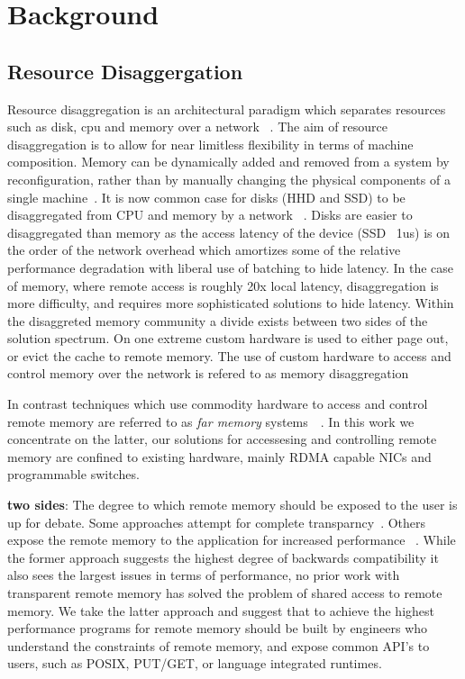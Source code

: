 \section{Background}


\subsection{Resource Disaggergation}

Resource disaggregation is an architectural paradigm which separates resources
such as disk, cpu and memory over a network ~\cite{requirements,legoos}. The aim
of resource disaggregation is to allow for near limitless flexibility in terms
of machine composition. Memory can be dynamically added and removed from a
system by reconfiguration, rather than by manually changing the physical
components of a single machine~\cite{fastswap}.  It is now common case for disks
(HHD and SSD) to be disaggregated from CPU and memory by a network
~\cite{decible}. Disks are easier to disaggregated than memory as the access
latency of the device (SSD ~1us) is on the order of the network overhead which
amortizes some of the relative performance degradation with liberal use of
batching to hide latency. In the case of memory, where remote access is roughly
20x local latency, disaggregation is more difficulty, and requires more
sophisticated solutions to hide latency. Within the disaggreted memory community
a divide exists between two sides of the solution spectrum. On one extreme
custom hardware is used to either page out, or evict the cache to remote memory.
The use of custom hardware to access and control memory over the network is
refered to as memory disaggregation


In contrast techniques which use commodity hardware to access and control remote
memory are referred to as \textit{far memory} systems~\cite{reigons, legoos,
clover}~. In this work we concentrate on the latter, our solutions
for accessesing and controlling remote memory are confined to existing hardware,
mainly RDMA capable NICs and programmable switches.

\textbf{two sides}: The degree to which remote memory should be exposed to the
user is up for debate. Some approaches attempt for complete
transparncy~\cite{fastswap,GMS,infiniswap,leap}. Others
expose the remote memory to the application for increased performance
~\cite{reigons, aifm}. While the former approach suggests the highest
degree of backwards compatibility it also sees the largest issues in terms of
performance, no prior work with transparent remote memory has solved the problem
of shared access to remote memory. We take the latter approach and suggest that
to achieve the highest performance programs for remote memory should be built by
engineers who understand the constraints of remote memory, and expose common
API's to users, such as POSIX, PUT/GET, or language integrated
runtimes\todo{\\cite}.

